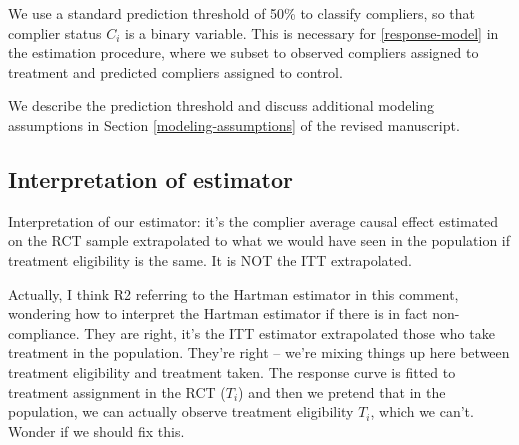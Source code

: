 \documentclass[hidelinks,12pt,letterpaper]{article}
\begin{document}

We use a standard prediction threshold of 50\% to classify compliers, so that complier status $C_i$ is a binary variable. This is necessary for \ref{response-model} in the estimation procedure, where we subset to observed compliers assigned to treatment and predicted compliers assigned to control. 

We describe the prediction threshold and discuss additional modeling assumptions in Section \ref{modeling-assumptions} of the revised manuscript. 

\subsection{Interpretation of estimator}



Interpretation of our estimator: it's the complier average causal effect estimated on the RCT sample extrapolated to what we would have seen in the population if treatment eligibility is the same. It is NOT the ITT extrapolated. 

Actually, I think R2 referring to the Hartman estimator in this comment, wondering how to interpret the Hartman estimator if there is in fact non-compliance. They are right, it's the ITT estimator extrapolated those who take treatment in the population. They're right -- we're mixing things up here between treatment eligibility and treatment taken. The response curve is fitted to treatment assignment in the RCT ($T_i$) and then we pretend that in the population, we can actually observe treatment eligibility $T_i$, which we can't. Wonder if we should fix this.
\end{document}

